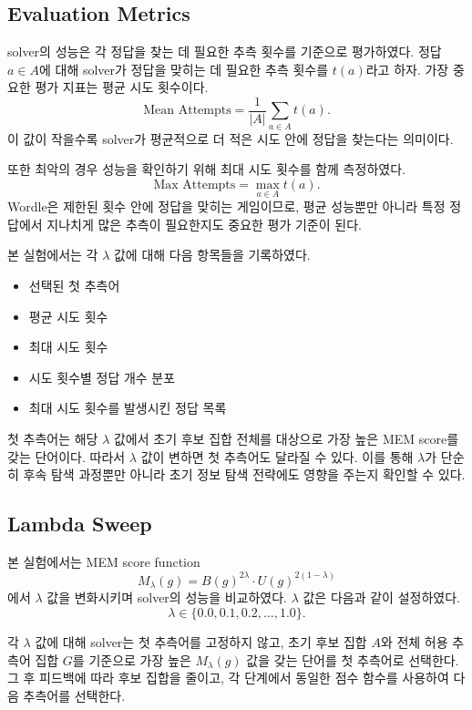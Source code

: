 \documentclass[11pt]{article}
\begin{document}
\subsection{Evaluation Metrics}

solver의 성능은 각 정답을 찾는 데 필요한 추측 횟수를 기준으로 평가하였다.
정답 $a \in A$에 대해 solver가 정답을 맞히는 데 필요한 추측 횟수를 $t(a)$라고 하자.
가장 중요한 평가 지표는 평균 시도 횟수이다.
\[
\text{Mean Attempts}
=
\frac{1}{|A|}
\sum_{a \in A} t(a).
\]
이 값이 작을수록 solver가 평균적으로 더 적은 시도 안에 정답을 찾는다는 의미이다.

또한 최악의 경우 성능을 확인하기 위해 최대 시도 횟수를 함께 측정하였다.
\[
\text{Max Attempts}
=
\max_{a \in A} t(a).
\]
Wordle은 제한된 횟수 안에 정답을 맞히는 게임이므로, 평균 성능뿐만 아니라 특정 정답에서 지나치게 많은 추측이 필요한지도 중요한 평가 기준이 된다.

본 실험에서는 각 $\lambda$ 값에 대해 다음 항목들을 기록하였다.
\begin{itemize}
    \item 선택된 첫 추측어
    \item 평균 시도 횟수
    \item 최대 시도 횟수
    \item 시도 횟수별 정답 개수 분포
    \item 최대 시도 횟수를 발생시킨 정답 목록
\end{itemize}

첫 추측어는 해당 $\lambda$ 값에서 초기 후보 집합 전체를 대상으로 가장 높은 MEM score를 갖는 단어이다.
따라서 $\lambda$ 값이 변하면 첫 추측어도 달라질 수 있다.
이를 통해 $\lambda$가 단순히 후속 탐색 과정뿐만 아니라 초기 정보 탐색 전략에도 영향을 주는지 확인할 수 있다.

\subsection{Lambda Sweep}

본 실험에서는 MEM score function
\[
M_{\lambda}(g)
=
B(g)^{2\lambda}
\cdot
U(g)^{2(1-\lambda)}
\]
에서 $\lambda$ 값을 변화시키며 solver의 성능을 비교하였다.
$\lambda$ 값은 다음과 같이 설정하였다.
\[
\lambda \in \{0.0, 0.1, 0.2, \ldots, 1.0\}.
\]

각 $\lambda$ 값에 대해 solver는 첫 추측어를 고정하지 않고, 초기 후보 집합 $A$와 전체 허용 추측어 집합 $G$를 기준으로 가장 높은 $M_{\lambda}(g)$ 값을 갖는 단어를 첫 추측어로 선택한다.
그 후 피드백에 따라 후보 집합을 줄이고, 각 단계에서 동일한 점수 함수를 사용하여 다음 추측어를 선택한다.
\end{document}
